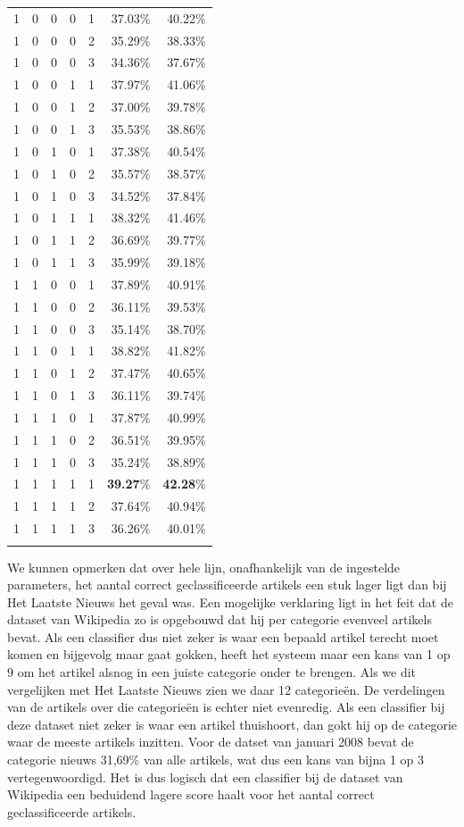 \begin{longtable}{rrrrrrr}
1	& 0	& 0	& 0	& 1	& 37.03\%	& 40.22\% \\
1	& 0	& 0	& 0	& 2	& 35.29\%	& 38.33\% \\
1	& 0	& 0	& 0	& 3	& 34.36\%	& 37.67\% \\
1	& 0	& 0	& 1	& 1	& 37.97\%	& 41.06\% \\
1	& 0	& 0	& 1	& 2	& 37.00\%	& 39.78\% \\
1	& 0	& 0	& 1	& 3	& 35.53\%	& 38.86\% \\
1	& 0	& 1	& 0	& 1	& 37.38\%	& 40.54\% \\
1	& 0	& 1	& 0	& 2	& 35.57\%	& 38.57\% \\
1	& 0	& 1	& 0	& 3	& 34.52\%	& 37.84\% \\
1	& 0	& 1	& 1	& 1	& 38.32\%	& 41.46\% \\
1	& 0	& 1	& 1	& 2	& 36.69\%	& 39.77\% \\
1	& 0	& 1	& 1	& 3	& 35.99\%	& 39.18\% \\
1	& 1	& 0	& 0	& 1	& 37.89\%	& 40.91\% \\
1	& 1	& 0	& 0	& 2	& 36.11\%	& 39.53\% \\
1	& 1	& 0	& 0	& 3	& 35.14\%	& 38.70\% \\
1	& 1	& 0	& 1	& 1	& 38.82\%	& 41.82\% \\
1	& 1	& 0	& 1	& 2	& 37.47\%	& 40.65\% \\
1	& 1	& 0	& 1	& 3	& 36.11\%	& 39.74\% \\
1	& 1	& 1	& 0	& 1	& 37.87\%	& 40.99\% \\
1	& 1	& 1	& 0	& 2	& 36.51\%	& 39.95\% \\
1	& 1	& 1	& 0	& 3	& 35.24\%	& 38.89\% \\
1	& 1	& 1	& 1	& 1	& \textbf{39.27}\%	& \textbf{42.28}\% \\
1	& 1	& 1 & 1	& 2	& 37.64\%	& 40.94\% \\
1	& 1	& 1	& 1	& 3	& 36.26\%	& 40.01\% \\
	\bottomrule
	\label{tab:preprocessing-wiki}
\end{longtable}%

We kunnen opmerken dat over hele lijn, onafhankelijk van de ingestelde parameters, het aantal correct geclassificeerde artikels een stuk lager ligt dan bij Het Laatste Nieuws het geval was. Een mogelijke verklaring ligt in het feit dat de dataset van Wikipedia zo is opgebouwd dat hij per categorie evenveel artikels bevat. Als een classifier dus niet zeker is waar een bepaald artikel terecht moet komen en bijgevolg maar gaat gokken, heeft het systeem maar een kans van 1 op 9 om het artikel alsnog in een juiste categorie onder te brengen. Als we dit vergelijken met Het Laatste Nieuws zien we daar 12 categorie\"en. De verdelingen van de artikels over die categorie\"en is echter niet evenredig. Als een classifier bij deze dataset niet zeker is waar een artikel thuishoort, dan gokt hij op de categorie waar de meeste artikels inzitten. Voor de datset van januari 2008 bevat de categorie nieuws 31,69\% van alle artikels, wat dus een kans van bijna 1 op 3 vertegenwoordigd. Het is dus logisch dat een classifier bij de dataset van Wikipedia een beduidend lagere score haalt voor het aantal correct geclassificeerde artikels.

